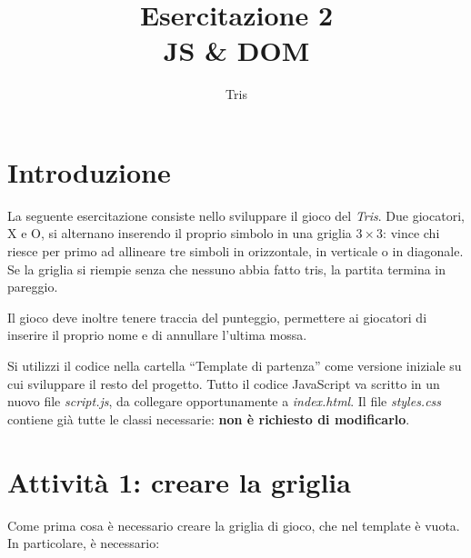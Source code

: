 \documentclass[a4paper,11pt]{article}
\title{Esercitazione 2\\JS \& DOM}
\author{}
\date{Tris}
\begin{document}
\maketitle

\section*{Introduzione}

La seguente esercitazione consiste nello sviluppare il gioco del \textit{Tris}.
Due giocatori, X e O, si alternano inserendo il proprio simbolo in una griglia
$3 \times 3$: vince chi riesce per primo ad allineare tre simboli in
orizzontale, in verticale o in diagonale. Se la griglia si riempie senza che
nessuno abbia fatto tris, la partita termina in pareggio.

Il gioco deve inoltre tenere traccia del punteggio, permettere ai giocatori di
inserire il proprio nome e di annullare l'ultima mossa.

Si utilizzi il codice nella cartella ``Template di partenza'' come versione
iniziale su cui sviluppare il resto del progetto. Tutto il codice JavaScript va
scritto in un nuovo file \textit{script.js}, da collegare opportunamente a
\textit{index.html}. Il file \textit{styles.css} contiene già tutte le classi
necessarie: \textbf{non è richiesto di modificarlo}.

\section*{Attività 1: creare la griglia}

Come prima cosa è necessario creare la griglia di gioco, che nel template è
vuota. In particolare, è necessario:
\end{document}
